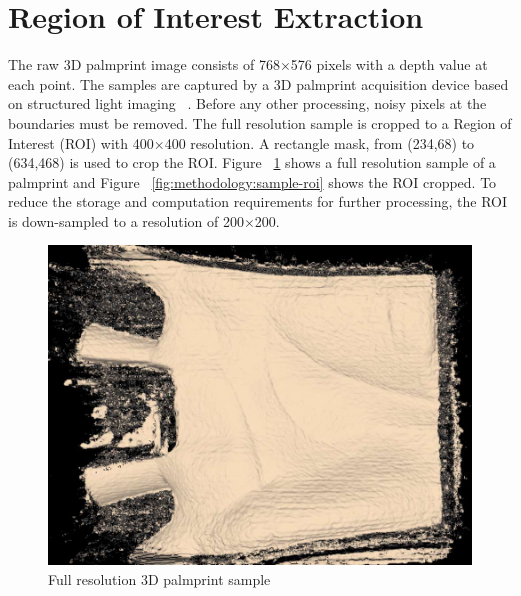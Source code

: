 \section{Region of Interest Extraction}
\label{sec:methodology:roiextraction}

The raw 3D palmprint image consists of 768$\times$576 pixels with a depth value at each point. The samples are captured by a 3D palmprint acquisition device based on structured light imaging ~\cite{Zhang:2009dp}. Before any other processing, noisy pixels at the boundaries must be removed. The full resolution sample is cropped to a Region of Interest (ROI) with 400$\times$400 resolution. A rectangle mask, from (234,68) to (634,468) is used to crop the ROI. Figure ~\ref{fig:methodology:sample-fullres} shows a full resolution sample of a palmprint and Figure ~\ref{fig:methodology:sample-roi} shows the ROI cropped. To reduce the storage and computation requirements for further processing, the ROI is down-sampled to a resolution of 200$\times$200.

\begin{figure}[htb]
\begin{center}
\includegraphics[width=0.9\linewidth]{ch-methodology/figures/sample-fullres}
\caption[Full resolution 3D palmprint sample]{Full resolution 3D palmprint sample}    \label{fig:methodology:sample-fullres}
\end{center}
\end{figure}

